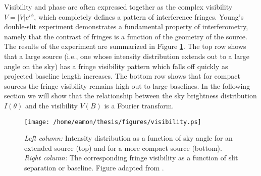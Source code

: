 Visibility and phase are often expressed together as the complex visibility $V=|V|e^{i\phi}$, which completely defines a pattern of interference fringes. Young's double-slit experiment demonstrates a fundamental property of interferometry, namely that the contrast of fringes is a function of the geometry of the source. The results of the experiment are summarized in Figure \ref{fig2.5}. The top row shows that a large source (i.e., one whose intensity distribution extends out to a large angle on the sky) has a fringe visibility pattern which falls off quickly as projected baseline length increases. The bottom row shows that for compact sources the fringe visibility remains high out to large baselines. In the following section we will show that the relationship between the sky brightness distribution $I(\theta)$ and the visibility $V(B)$ is a Fourier transform.

\begin{figure}[hbt!]
\centering 
          \texttt{[image: /home/eamon/thesis/figures/visibility.ps]}
\caption[Visibilities for various source sizes.]{\textit{Left column:} Intensity distribution as a function of sky angle for an extended source (top) and for a more compact source (bottom). \textit{Right column:} The corresponding fringe visibility as a function of slit separation or baseline. Figure adapted from \cite{jackson_2008}.}
\label{fig2.5}
\end{figure}

